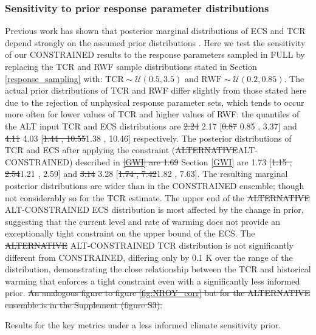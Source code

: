 \documentclass[gmd, manuscript]{copernicus}
\providecommand{\DIFadd}[1]{{\protect\color{blue}#1}} %
\providecommand{\DIFdel}[1]{{\protect\color{red}\sout{#1}}}                      %
\providecommand{\DIFaddbegin}{} %
\providecommand{\DIFaddend}{} %
\providecommand{\DIFdelbegin}{} %
\providecommand{\DIFdelend}{} %
\providecommand{\DIFaddFL}[1]{\DIFadd{#1}} %
\begin{document}
\subsubsection{Sensitivity to prior response parameter distributions}
Previous work has shown that posterior marginal distributions of ECS and TCR depend strongly on the assumed prior distributions \citep{Bodman2016}. Here we test the sensitivity of our CONSTRAINED results to the response parameters sampled in FULL by replacing the TCR and RWF sample distributions stated in \DIFaddbegin \DIFadd{Section }\DIFaddend \ref{response_sampling} with: $\mathrm{TCR}\sim\mathcal{U}\left(0.5,3.5\right)$ and $\mathrm{RWF}\sim\mathcal{U}\left(0.2,0.85\right)$. The actual prior distributions of TCR and RWF differ slightly from those stated here due to the rejection of unphysical response parameter sets, which tends to occur more often for lower values of TCR and higher values of RWF: the quantiles of the \DIFaddbegin \DIFadd{ALT }\DIFaddend input TCR and ECS distributions are \DIFdelbegin \DIFdel{2.24 }\DIFdelend \DIFaddbegin \DIFadd{2.17 }\DIFaddend [\DIFdelbegin \DIFdel{0.87 }\DIFdelend \DIFaddbegin \DIFadd{0.85 }\DIFaddend , 3.37] and \DIFdelbegin \DIFdel{4.11 }\DIFdelend \DIFaddbegin \DIFadd{4.03 }\DIFaddend [\DIFdelbegin \DIFdel{1.44 , 10.55}\DIFdelend \DIFaddbegin \DIFadd{1.38 , 10.46}\DIFaddend ] respectively. The posterior distributions of TCR and ECS after applying the constraint (\DIFdelbegin \DIFdel{ALTERNATIVE}\DIFdelend \DIFaddbegin \DIFadd{ALT-CONSTRAINED}\DIFaddend ) described in \DIFdelbegin \DIFdel{\ref{GWI} are 1.69 }\DIFdelend \DIFaddbegin \DIFadd{Section \ref{GWI} are 1.73 }\DIFaddend [\DIFdelbegin \DIFdel{1.15 , 2.54}\DIFdelend \DIFaddbegin \DIFadd{1.21 , 2.59}\DIFaddend ] and \DIFdelbegin \DIFdel{3.14 }\DIFdelend \DIFaddbegin \DIFadd{3.28 }\DIFaddend [\DIFdelbegin \DIFdel{1.74 , 7.42}\DIFdelend \DIFaddbegin \DIFadd{1.82 , 7.63}\DIFaddend ]. The resulting marginal posterior distributions are wider than in the CONSTRAINED ensemble; though not considerably so for the TCR estimate. The upper end of the \DIFdelbegin \DIFdel{ALTERNATIVE }\DIFdelend \DIFaddbegin \DIFadd{ALT-CONSTRAINED }\DIFaddend ECS distribution is most affected by the change in prior, suggesting that the current level and rate of warming does not provide an exceptionally tight constraint on the upper bound of the ECS. The \DIFdelbegin \DIFdel{ALTERNATIVE }\DIFdelend \DIFaddbegin \DIFadd{ALT-CONSTRAINED }\DIFaddend TCR distribution is not significantly different from CONSTRAINED, differing only by 0.1 K over the range of the distribution, demonstrating the close relationship between the TCR and historical warming \citep{Sanderson2020a} that enforces a tight constraint even with a significantly less informed prior.
\DIFdelbegin \DIFdel{An analogous figure to figure \ref{fig:NROY_corr} but for the ALTERNATIVE ensemble is in the Supplement (figure S3). 
}\DIFdelend \DIFaddbegin \begin{table}[h]
    \caption{\DIFaddFL{Results for the key metrics under a less informed climate sensitivity prior.}}
    \label{table:alt_results}
    {\footnotesize
    
    }
\end{table}
\clearpage
\end{document}
